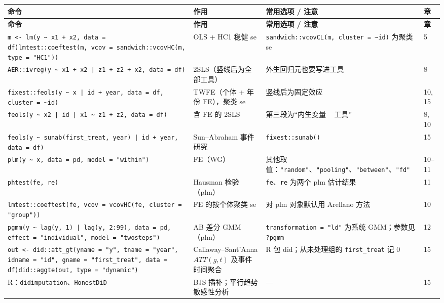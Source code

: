 {\renewcommand{\arraystretch}{1.12}\begin{longtable}{@{}>{\raggedright\arraybackslash\small}p{5.3cm}>{\raggedright\arraybackslash\small}p{3.8cm}>{\raggedright\arraybackslash\small}p{5.3cm}>{\centering\arraybackslash\small}p{0.9cm}@{}}
\toprule
\textbf{命令} & \textbf{作用} & \textbf{常用选项 / 注意} & \textbf{章}\\
\midrule
\endfirsthead
\toprule
\textbf{命令} & \textbf{作用} & \textbf{常用选项 / 注意} & \textbf{章}\\
\midrule
\endhead
\bottomrule
\endlastfoot

\texttt{m <- lm(y \textasciitilde{} x1 + x2, data = df)}\newline \texttt{lmtest::coeftest(m, vcov = sandwich::vcovHC(m, type = "HC1"))} & OLS + HC1 稳健 se & \texttt{sandwich::vcovCL(m, cluster = \textasciitilde{}id)} 为聚类 se & 5\\
\addlinespace[1pt]
\texttt{AER::ivreg(y \textasciitilde{} x1 + x2 | z1 + z2 + x2, data = df)} & 2SLS（竖线后为全部工具） & 外生回归元也要写进工具 & 8\\
\addlinespace[1pt]
\texttt{fixest::feols(y \textasciitilde{} x | id + year, data = df, cluster = \textasciitilde{}id)} & TWFE（个体 + 年份 FE），聚类 se & 竖线后为固定效应 & 10, 15\\
\addlinespace[1pt]
\texttt{feols(y \textasciitilde{} x2 | id | x1 \textasciitilde{} z1 + z2, data = df)} & 含 FE 的 2SLS & 第三段为“内生变量 ~ 工具” & 8, 10\\
\addlinespace[1pt]
\texttt{feols(y \textasciitilde{} sunab(first\_treat, year) | id + year, data = df)} & Sun–Abraham 事件研究 & \texttt{fixest::sunab()} & 15\\
\addlinespace[1pt]
\texttt{plm(y \textasciitilde{} x, data = pd, model = "within")} & FE（WG） & 其他取值：\texttt{"random"}、\texttt{"pooling"}、\texttt{"between"}、\texttt{"fd"} & 10–11\\
\addlinespace[1pt]
\texttt{phtest(fe, re)} & Hausman 检验（plm） & \texttt{fe}、\texttt{re} 为两个 plm 估计结果 & 11\\
\addlinespace[1pt]
\texttt{lmtest::coeftest(fe, vcov = vcovHC(fe, cluster = "group"))} & FE 的按个体聚类 se & 对 plm 对象默认用 Arellano 方法 & 10\\
\addlinespace[1pt]
\texttt{pgmm(y \textasciitilde{} lag(y, 1) | lag(y, 2:99), data = pd, effect = "individual", model = "twosteps")} & AB 差分 GMM（plm） & \texttt{transformation = "ld"} 为系统 GMM；参数见 \texttt{?pgmm} & 12\\
\addlinespace[1pt]
\texttt{out <- did::att\_gt(yname = "y", tname = "year", idname = "id", gname = "first\_treat", data = df)}\newline \texttt{did::aggte(out, type = "dynamic")} & Callaway–Sant'Anna $ATT(g,t)$ 及事件时间聚合 & R 包 did；从未处理组的 \texttt{first\_treat} 记 0 & 15\\
\addlinespace[1pt]
R：\texttt{didimputation}、\texttt{HonestDiD} & BJS 插补；平行趋势敏感性分析 & — & 15\\
\end{longtable}}



